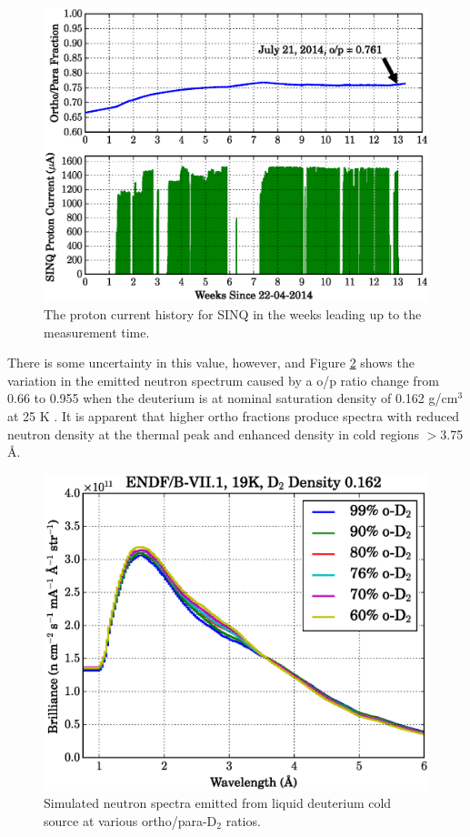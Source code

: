 \documentclass[5p,12pt]{elsarticle}
\begin{document}
\begin{figure}[h!] 
  \centering
    \includegraphics[width=\columnwidth]{graphics/p_current.eps}
     \caption{The proton current history for SINQ in the weeks leading up to the measurement time. \label{fig:p_current}}
\end{figure}

There is some uncertainty in this value, however, and Figure \ref{fig:op_compare} shows the variation in the emitted neutron spectrum caused by a o/p ratio change from 0.66 to 0.955 when the deuterium is at nominal saturation density of 0.162 g/cm$^3$ at 25 K \cite{bnl_cryo}.  It is apparent that higher ortho fractions produce spectra with reduced neutron density at the thermal peak and enhanced density in cold regions $>$3.75 {\AA}.

\begin{figure}[h!] 
  \centering
    \includegraphics[width=\columnwidth]{graphics/op_compare.eps}
     \caption{Simulated neutron spectra emitted from liquid deuterium cold source at various ortho/para-D$_2$ ratios. \label{fig:op_compare}}
\end{figure}
\end{document}
